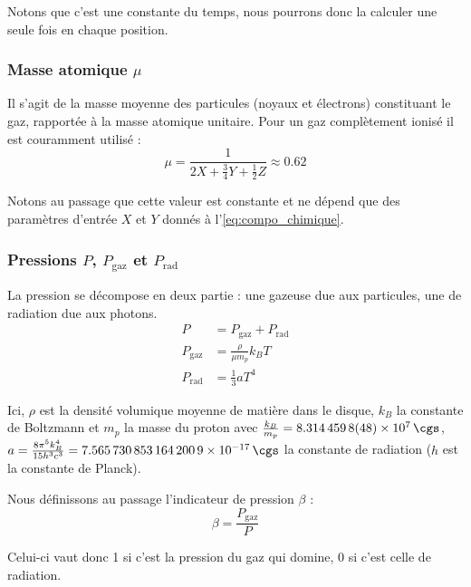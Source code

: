 Notons que c’est une constante du temps, nous pourrons donc la calculer une
seule fois en chaque position.

\subsubsection{\texorpdfstring{Masse atomique $\mu$}{Masse atomique μ}}

Il s’agit de la masse moyenne des particules (noyaux et électrons) constituant
le gaz, rapportée à la masse atomique unitaire. Pour un gaz complètement ionisé
il est couramment utilisé :
\begin{equation}
    \label{eq:masse_atomique}
    \mu = \frac{1}{2 X + \frac{3}{4} Y + \frac{1}{2} Z} \approx 0.62
\end{equation}

Notons au passage que cette valeur est constante et ne dépend que des
paramètres d’entrée $X$ et $Y$ donnés à l’\cref{eq:compo_chimique}.

\subsubsection{\texorpdfstring{Pressions $P$, $P_\mathrm{gaz}$ et $P_\mathrm{rad}$}{Pressions P, Pgaz et Prad}}

La pression se décompose en deux partie : une gazeuse due aux particules, une
de radiation due aux photons.
\begin{align}
    \label{eq:pression}
    P &= P_{\mathrm{gaz}} + P_{\mathrm{rad}} \\
    \label{eq:pression_gaz}
    P_{\mathrm{gaz}} &= \frac{\rho}{\mu m_p} k_B T \\
    \label{eq:pression_radiation}
    P_{\mathrm{rad}} &= \frac{1}{3} a T^4
\end{align}

Ici, $\rho$ est la densité volumique moyenne de matière dans le disque, $k_B$
la constante de Boltzmann et $m_p$ la masse du proton avec $\frac{k_B}{m_p} =
\SI{8.3144598(48)d7}{\cgs}$, $a = \frac{8 \pi^5 k_B^4}{15 h^3 c^3} =
\SI{7.5657308531642009e-17}{\cgs}$ la constante de radiation ($h$ est la
constante de Planck).

Nous définissons au passage l’indicateur de pression $\beta$ :
\begin{equation}
    \label{eq:indicateur_pression}
    \beta = \frac{P_{\mathrm{gaz}}}{P}
\end{equation}

Celui-ci vaut donc 1 si c’est la pression du gaz qui domine, 0 si c’est celle
de radiation.

